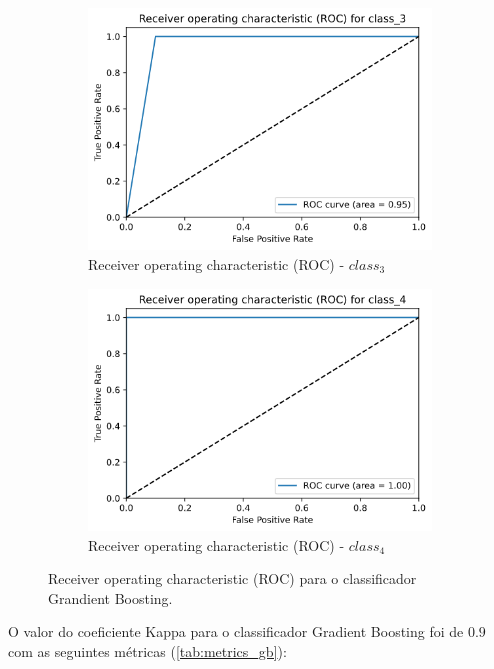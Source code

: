 \documentclass[
	article,			%
	11pt,				%
	oneside,			%
	a4paper,			%
	english,			%
	brazil,				%
	sumario=tradicional
	]{abntex2}
\begin{document}
\begin{figure}[H]
\begin{subfigure}[b]{0.475\textwidth}
    \includegraphics[scale=0.375]{fig/gb_roc3.png}
    \caption{Receiver operating characteristic (ROC) - $class_3$}
    \label{fig:gb_roc3}
    \end{subfigure}
    \hfill
    \begin{subfigure}[b]{0.475\textwidth}
    \centering
    \includegraphics[scale=0.375]{fig/gb_roc4.png}
    \caption{Receiver operating characteristic (ROC) - $class_4$}
    \label{fig:gb_roc4}
    \end{subfigure}
    \caption{Receiver operating characteristic (ROC) para o classificador Grandient Boosting.}
    \label{gb_roc}
\end{figure}


O valor do coeficiente Kappa para o classificador Gradient Boosting foi de $0.9$ com as seguintes métricas (\ref{tab:metrics_gb}):
\end{document}
